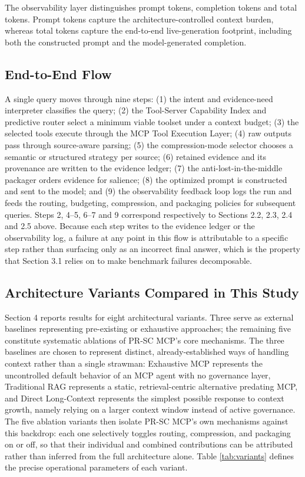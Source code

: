 The observability layer distinguishes prompt tokens, completion tokens and total tokens. Prompt tokens capture the architecture-controlled context burden, whereas total tokens capture the end-to-end live-generation footprint, including both the constructed prompt and the model-generated completion.

\subsection{End-to-End Flow}

A single query moves through nine steps: (1) the intent and evidence-need interpreter classifies the query; (2) the Tool-Server Capability Index and predictive router select a minimum viable toolset under a context budget; (3) the selected tools execute through the MCP Tool Execution Layer; (4) raw outputs pass through source-aware parsing; (5) the compression-mode selector chooses a semantic or structured strategy per source; (6) retained evidence and its provenance are written to the evidence ledger; (7) the anti-lost-in-the-middle packager orders evidence for salience; (8) the optimized prompt is constructed and sent to the model; and (9) the observability feedback loop logs the run and feeds the routing, budgeting, compression, and packaging policies for subsequent queries. Steps 2, 4--5, 6--7 and 9 correspond respectively to Sections 2.2, 2.3, 2.4 and 2.5 above. Because each step writes to the evidence ledger or the observability log, a failure at any point in this flow is attributable to a specific step rather than surfacing only as an incorrect final answer, which is the property that Section 3.1 relies on to make benchmark failures decomposable.

\subsection{Architecture Variants Compared in This Study}

Section 4 reports results for eight architectural variants. Three serve as external baselines representing pre-existing or exhaustive approaches; the remaining five constitute systematic ablations of PR-SC MCP's core mechanisms. The three baselines are chosen to represent distinct, already-established ways of handling context rather than a single strawman: Exhaustive MCP represents the uncontrolled default behavior of an MCP agent with no governance layer, Traditional RAG represents a static, retrieval-centric alternative predating MCP, and Direct Long-Context represents the simplest possible response to context growth, namely relying on a larger context window instead of active governance. The five ablation variants then isolate PR-SC MCP's own mechanisms against this backdrop: each one selectively toggles routing, compression, and packaging on or off, so that their individual and combined contributions can be attributed rather than inferred from the full architecture alone. Table \ref{tab:variants} defines the precise operational parameters of each variant.

